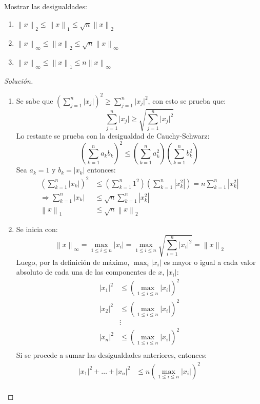 \documentclass[12pt]{book}
\newcommand\norm[1]{\left\lVert#1\right\rVert}
\newcommand\abs[1]{\left\lvert#1\right\rvert}
\newenvironment{solucion}
  {\renewcommand\qedsymbol{$\square$}\begin{proof}[Solución]}
  {\end{proof}}
\begin{document}
\eje Mostrar las desigualdades:
\renewcommand{\labelenumi}{(\alph{enumi})}
\begin{enumerate}
    \item $\norm{x}_2\leq\norm{x}_1\leq\sqrt{n}\norm{x}_2$
    \item$\norm{x}_\infty\leq\norm{x}_2\leq\sqrt{n}\norm{x}_\infty$
    \item$\norm{x}_\infty\leq\norm{x}_1\leq n\norm{x}_\infty$
\end{enumerate}
\begin{solucion}
\renewcommand{\labelenumi}{(\alph{enumi})}
\begin{enumerate}
    \item Se sabe que $\left(\sum_{j=1}^n\lvert x_j\rvert\right)^2\geq\sum_{j=1}^n\lvert x_j\rvert^2$, con esto se prueba que:
    \[
        \sum_{j=1}^n\lvert x_j\rvert\geq\sqrt{\sum_{j=1}^n\lvert x_j\rvert^2}
    \]
    Lo restante se prueba con la desigualdad de Cauchy-Schwarz:
    \[
        \left(\sum_{k=1}^na_kb_k\right)^2\leq\left(\sum_{k=1}^na_k^2\right)\left(\sum_{k=1}^nb_{k}^2\right)
    \]
    Sea $a_k=1$ y $b_k=\abs{x_k}$ entonces:
    \begin{align*}
        \left(\sum_{k=1}^n\abs{x_k}\right)^2&\leq\left(\sum_{k=1}^n1^2\right)\left(\sum_{k=1}^n\abs{x_{k}^2}\right)=n\sum_{k=1}^n\abs{x_{k}^2}\\
        \Rightarrow\sum_{k=1}^n\abs{x_k}&\leq\sqrt{n}\sum_{k=1}^n\abs{x_{k}^2}\\
        \norm{x}_1&\leq\sqrt{n}\norm{x}_2
    \end{align*}
    \item Se inicia con:
    \[
    \norm{x}_\infty=\max_{1\leq i\leq n}\abs{x_i}=\max_{1\leq i\leq n}\sqrt{\sum_{i=1}^n\abs{x_i}^2}=\norm{x}_2
    \]
    \newpage
    Luego, por la definición de máximo, $\max_{i}\abs{x_i}$ es mayor o igual a cada valor absoluto de cada una de las componentes de $x$, $\abs{x_i}$:
    \begin{align*}
        \abs{x_1}^2&\leq\left(\max_{1\leq i\leq n}\abs{x_i}\right)^2\\
        \abs{x_2}^2&\leq\left(\max_{1\leq i\leq n}\abs{x_i}\right)^2\\
        &\vdots\\
        \abs{x_n}^2&\leq\left(\max_{1\leq i\leq n}\abs{x_i}\right)^2\\
    \end{align*}
    Si se procede a sumar las desigualdades anteriores, entonces:
    \begin{align*}
        \abs{x_1}^2+\dots+\abs{x_n}^2&\leq n \left(\max_{1\leq i\leq n}\abs{x_i}\right)^2\\

\end{align*}
\end{enumerate}
\end{solucion}
\end{document}
